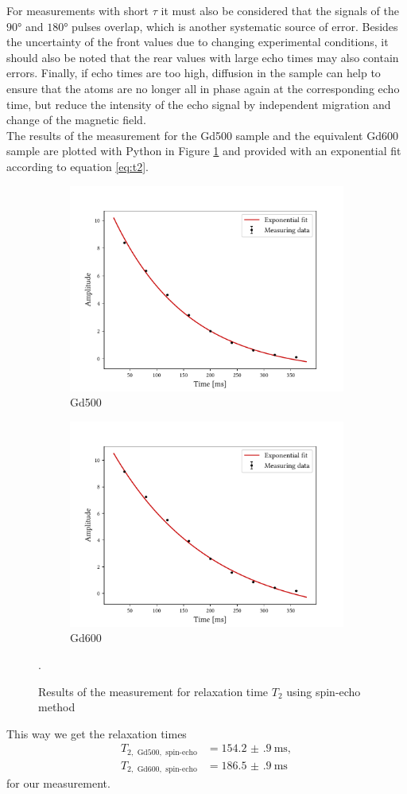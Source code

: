 For measurements with short $\tau$ it must also be considered that the signals of the $\ang{90}$ and $\ang{180}$ pulses overlap, which is another systematic source of error.
Besides the uncertainty of the front values due to changing experimental conditions, it should also be noted that the rear values with large echo times may also contain errors.
Finally, if echo times are too high, diffusion in the sample can help to ensure that the atoms are no longer all in phase again at the corresponding echo time, but reduce the intensity of the echo signal by independent migration and change of the magnetic field.\\
The results of the measurement for the Gd500 sample and the equivalent Gd600 sample are plotted with Python in Figure \ref{fig:t2se} and provided with an exponential fit according to equation \ref{eq:t2}.
\begin{figure}[ht]
\begin{subfigure}{.45\textwidth}
\includegraphics[width=9.3cm]{..//figures//f61_abb_2.pdf}
\caption{Gd500}
\end{subfigure}
\qquad
\begin{subfigure}{.45\textwidth}
\includegraphics[width=9.3cm]{..//figures//f61_abb_2_600.pdf}
\caption{Gd600}
\end{subfigure}
\caption{Results of the measurement for relaxation time $T_2$ using spin-echo method}.
\label{fig:t2se}
\end{figure}
This way we get the relaxation times
\begin{align*}
T_{2,\text{ Gd500},\text{ spin-echo}}&=\SI{154.2(9)}{\milli\second},\\
T_{2,\text{ Gd600},\text{ spin-echo}}&=\SI{186.5(9)}{\milli\second}
\end{align*}
for our measurement.

